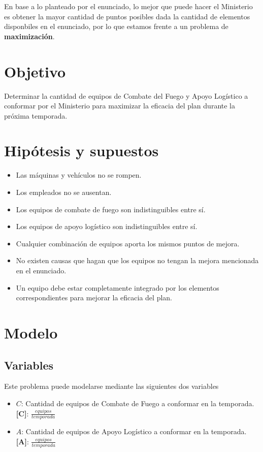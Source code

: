 \documentclass[12pt]{article}
\begin{document}
En base a lo planteado por el enunciado, lo mejor que puede
hacer el Ministerio es obtener la mayor cantidad de puntos posibles
dada la cantidad de elementos disponbiles en el enunciado, por
lo que estamos frente a un problema de \textbf{maximización}.

\section{Objetivo}

Determinar la cantidad de equipos de Combate del Fuego y Apoyo
Logístico a conformar por el Ministerio para maximizar la eficacia
del plan durante la próxima temporada.

\section{Hipótesis y supuestos}

\begin{itemize}
\item Las máquinas y vehículos no se rompen.
\item Los empleados no se ausentan.
\item Los equipos de combate de fuego son indistinguibles entre sí.
\item Los equipos de apoyo logístico son indistinguibles entre sí.
\item Cualquier combinación de equipos aporta los mismos puntos de mejora.
\item No existen causas que hagan que los equipos no tengan la mejora mencionada en el enunciado.
\item Un equipo debe estar completamente integrado por los elementos correspondientes para mejorar la eficacia del plan.
\end{itemize}

\section{Modelo}

\subsection{Variables}

Este problema puede modelarse mediante las siguientes dos variables

\begin{itemize}
\item $C$: Cantidad de equipos de Combate de Fuego a conformar en la temporada. \textbf{[C]}: $\frac{equipos}{temporada}$
\item $A$: Cantidad de equipos de Apoyo Logístico a conformar en la temporada. \textbf{[A]}: $\frac{equipos}{temporada}$
\end{itemize}
\end{document}
